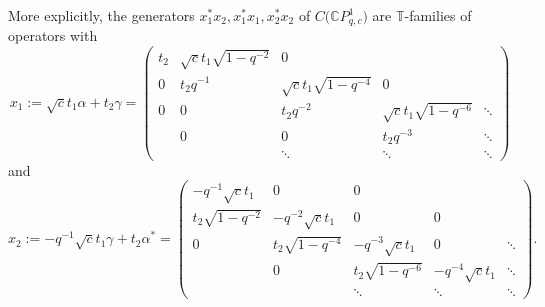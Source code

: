 \documentclass[pdftex]{sigma}
\begin{document}
More explicitly, the generators $x_{1}^{\ast}x_{2},x_{1}^{\ast}x_{1},x_{2}^{\ast}x_{2}$ of $C\big( \mathbb{C}P_{q,c}^{1}\big) $ are
$\mathbb{T}$-families of operators with
\[
x_{1}:=\sqrt{c}t_{1}\alpha+t_{2}\gamma=\left(
\begin{matrix}
t_{2} & \sqrt{c}t_{1}\sqrt{1-q^{-2}} & 0 & & \\
0 & t_{2}q^{-1} & \sqrt{c}t_{1}\sqrt{1-q^{-4}} & 0 & \\
0 & 0 & t_{2}q^{-2} & \sqrt{c}t_{1}\sqrt{1-q^{-6}} & \ddots\\
& 0 & 0 & t_{2}q^{-3} & \ddots\\
& & \ddots & \ddots & \ddots
\end{matrix}
\right)
\]
and
\[
x_{2}:=-q^{-1}\sqrt{c}t_{1}\gamma+t_{2}\alpha^{\ast}=\left(
\begin{matrix}
-q^{-1}\sqrt{c}t_{1} & 0 & 0 & & \\
t_{2}\sqrt{1-q^{-2}} & -q^{-2}\sqrt{c}t_{1} & 0 & 0 & \\
0 & t_{2}\sqrt{1-q^{-4}} & -q^{-3}\sqrt{c}t_{1} & 0 & \ddots\\
& 0 & t_{2}\sqrt{1-q^{-6}} & -q^{-4}\sqrt{c}t_{1} & \ddots\\
& & \ddots & \ddots & \ddots
\end{matrix}
\right) .
\]
\end{document}

